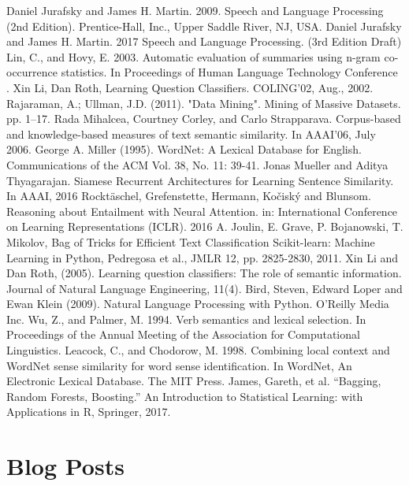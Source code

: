 \documentclass[letterpaper, 10 pt, conference]{ieeeconf}  %
\begin{document}
\pagebreak
\begin{thebibliography}{99}
 Daniel Jurafsky and James H. Martin. 2009. Speech and Language Processing (2nd Edition). Prentice-Hall, Inc., Upper Saddle River, NJ, USA.
 Daniel Jurafsky and James H. Martin. 2017 Speech and Language Processing. (3rd Edition Draft) 
 Lin, C., and Hovy, E. 2003. Automatic evaluation of summaries
using n-gram co-occurrence statistics. In Proceedings of Human
Language Technology Conference .
 Xin Li, Dan Roth, Learning Question Classifiers. COLING'02, Aug., 2002.
 Rajaraman, A.; Ullman, J.D. (2011). "Data Mining". Mining of Massive Datasets. pp. 1–17.
 Rada Mihalcea, Courtney Corley, and Carlo Strapparava. Corpus-based and knowledge-based measures of text semantic similarity. In AAAI’06, July 2006.
 George A. Miller (1995). WordNet: A Lexical Database for English. 
Communications of the ACM Vol. 38, No. 11: 39-41.
 Jonas Mueller and Aditya Thyagarajan. Siamese Recurrent Architectures for Learning Sentence Similarity. In AAAI, 2016
 Rocktäschel, Grefenstette, Hermann, Kočiský and Blunsom. Reasoning about Entailment with Neural Attention. in: International Conference on Learning Representations (ICLR). 2016
 A. Joulin, E. Grave, P. Bojanowski, T. Mikolov, Bag of Tricks for Efficient Text Classification
 Scikit-learn: Machine Learning in Python, Pedregosa et al., JMLR 12, pp. 2825-2830, 2011.
 Xin Li and Dan Roth, (2005). Learning question classifiers: The role of semantic information. Journal of Natural Language Engineering, 11(4).
 Bird, Steven, Edward Loper and Ewan Klein (2009). Natural Language Processing with Python.  O'Reilly Media Inc.
 Wu, Z., and Palmer, M. 1994. Verb semantics and lexical selection. In Proceedings of the Annual Meeting of the Association for Computational Linguistics.
 Leacock, C., and Chodorow, M. 1998. Combining local context and WordNet sense similarity for word sense identification. In WordNet, An Electronic Lexical Database. The MIT Press.
 James, Gareth, et al. “Bagging, Random Forests, Boosting.” An Introduction to Statistical Learning: with Applications in R, Springer, 2017.

\section*{Blog Posts}


\end{thebibliography}
\end{document}
